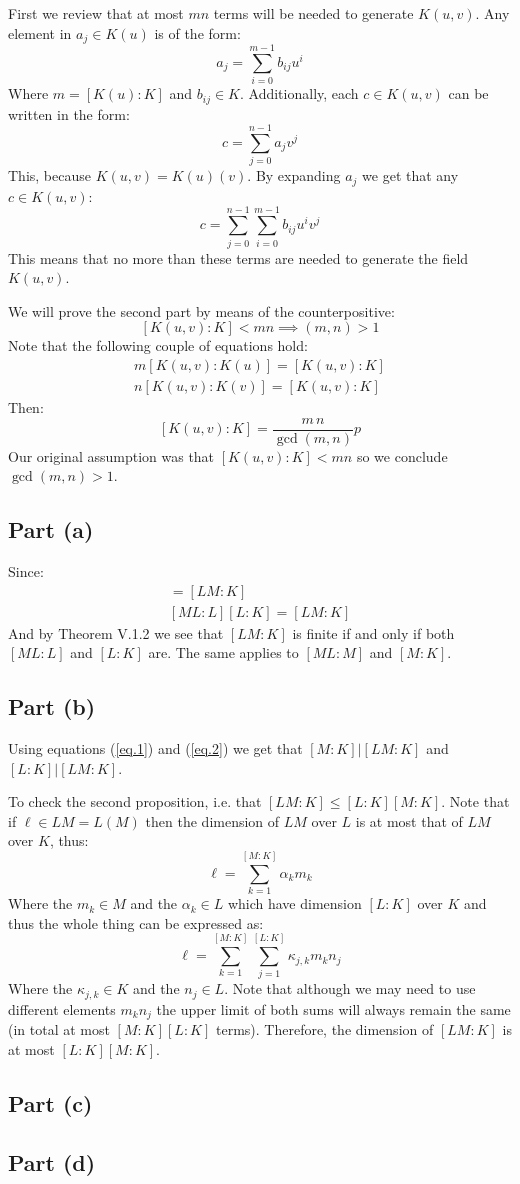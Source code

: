 First we review that at most $mn$ terms will be needed to generate $K(u,v)$.
Any element in $a_j\in K(u)$ is of the form:
$$a_j = \sum_{i=0}^{m-1} b_{ij} u^i$$
Where $m=[K(u):K]$ and $b_{ij}\in K$. 
Additionally, each $c\in K(u,v)$ can be written in the form:
$$c= \sum_{j=0}^{n-1} a_{j} v^j$$
This, because $K(u,v)= K(u)(v)$. By expanding $a_j$ we get that any $c\in K(u,v)$:
$$c= \sum_{j=0}^{n-1} \sum_{i=0}^{m-1} b_{ij} u^i v^j$$
This means that no more than these terms are needed to generate the field $K(u,v)$.

We will prove the second part by means of the counterpositive: 
$$[K(u,v):K]<mn \implies (m,n)>1$$ 
Note that the following couple of equations hold:
\begin{gather*}
m[K(u,v):K(u)] = [K(u,v):K]\\
n[K(u,v):K(v)] = [K(u,v):K]
\end{gather*}
Then:
$$[K(u,v):K] = \frac{m\, n}{\gcd(m,n)}p$$
Our original assumption was that $[K(u,v):K]<mn$ so we conclude $\gcd(m,n)>1$. 

\subsection*{Part (a)}
Since:
\begin{gather} 
    [ML:M][M:K] = [LM:K]\label{eq.1}\\
    [ML:L][L:K] = [LM:K]\label{eq.2}
\end{gather}
And by Theorem V.1.2 we see that $[LM:K]$ is finite if and only if both $[ML:L]$ and $[L:K]$ are.
The same applies to $[ML:M]$ and $[M:K]$. 

\subsection*{Part (b)}
Using equations (\ref{eq.1}) and (\ref{eq.2}) we get that $[M:K]| [LM:K]$ and $[L:K]| [LM:K]$. 

To check the second proposition, i.e. that $[LM:K]\leq [L:K][M:K]$. Note that if $\ell \in LM = L(M)$ then the dimension of $LM$ over $L$ is at most that of $LM$ over $K$, thus:
$$\ell = \sum_{k=1}^{[M:K]}\alpha_k m_k$$
Where the  $m_k\in M$ and the $\alpha_k \in L$ which have dimension $[L:K]$ over $K$ and thus the whole thing can be expressed as:
$$\ell =  \sum_{k=1}^{[M:K]}\sum_{j=1}^{[L:K]}\kappa_{j,k}m_kn_j$$
Where the $\kappa_{j,k}\in K$ and the $n_j\in L$. Note that although we may need to use different elements $m_kn_j$ the upper limit of both sums will always remain the same (in total at most $[M:K][L:K]$ terms). Therefore, the dimension of $[LM:K]$ is at most $[L:K][M:K]$. 
\subsection*{Part (c)}
\subsection*{Part (d)}
